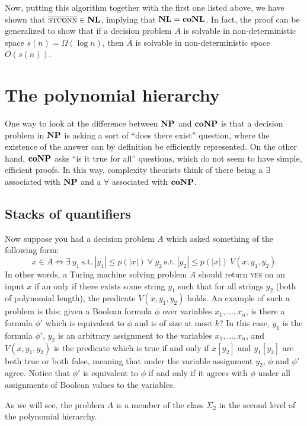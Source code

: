 Now, putting this algorithm together with the first one listed above,
we have shown that $\overline{\textsc{stconn}} \in \nl$, implying that
$\nl = \conl$.  In fact, the proof can be generalized to show that if
a decision problem $A$ is solvable in non-deterministic space $s(n) =
\Omega(\log n)$, then $\overline{A}$ is solvable in non-deterministic
space $O(s(n))$.

\section{The polynomial hierarchy}

One way to look at the difference between $\np$ and $\cnp$ is that a
decision problem in $\np$ is asking a sort of ``does there exist''
question, where the existence of the answer can by definition be
efficiently represented.  On the other hand, $\cnp$ asks ``is it
true for all'' questions, which do not seem to have simple, efficient
proofs.  In this way, complexity theorists think of there being a
$\exists$ associated with $\np$ and a $\forall$ associated with $\cnp$.

\subsection{Stacks of quantifiers}

Now suppose you had a decision problem $A$ which asked something of
the following form:
\[ x \in A \Leftrightarrow \exists~y_1~\mbox{s.t.}~|y_1| \le p(|x|)~\forall~y_2~\mbox{s.t.}~|y_2| \le p(|x|)~V(x,y_1, y_2) \]
In other words, a Turing machine solving problem $A$ should return
\textsc{yes} on an input $x$ if an only if there exists some string
$y_1$ such that for all strings $y_2$ (both of polynomial length), the
predicate $V(x,y_1, y_2)$ holds.  An example of such a problem is
this: given a Boolean formula $\phi$ over variables $x_1, \ldots,
x_n$, is there a formula $\phi'$ which is equivalent to $\phi$ and is
of size at most $k$?  In this case, $y_1$ is the formula $\phi'$,
$y_2$ is an arbitrary assignment to the variables $x_1, \ldots, x_n$,
and $V(x,y_1, y_2)$ is the predicate which is true if and only if
$x[y_2]$ and $y_1[y_2]$ are both true or both false, meaning that
under the variable assignment $y_2$, $\phi$ and $\phi'$ agree.  Notice
that $\phi'$ is equivalent to $\phi$ if and only if it agrees with
$\phi$ under all assignments of Boolean values to the variables.

As we will see, the problem $A$ is a member of the class $\Sigma_2$ in
the second level of the polynomial hierarchy.

